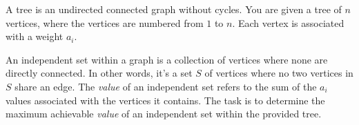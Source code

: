A tree is an undirected connected graph without cycles.
You are given a tree of $n$ vertices, where the vertices are numbered from $1$ to $n$.
Each vertex is associated with a weight $a_i$.

An independent set within a graph is a collection of vertices where none are directly connected.
In other words, it's a set $S$ of vertices where no two vertices in $S$ share an edge.
The \textit{value} of an independent set refers to the sum of the $a_i$ values associated with the vertices it contains.
The task is to determine the maximum achievable \textit{value} of an independent set within the provided tree.